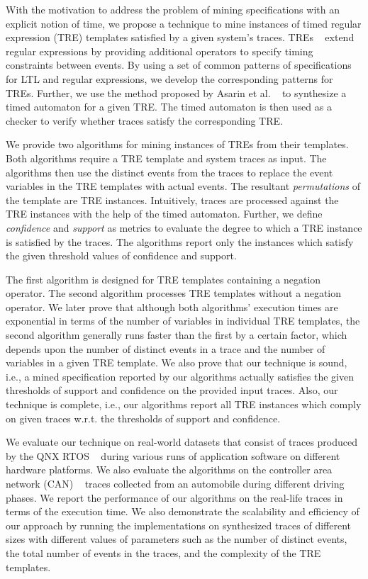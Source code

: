 \documentclass[]{sigplanconf}
\begin{document}
With the motivation to address the problem of mining specifications with an explicit notion of time, we propose a technique to mine instances of timed regular expression (TRE) templates satisfied by a given system's traces. TREs ~\cite{timedregex} extend regular expressions by providing additional operators to specify timing constraints between events. By using a set of common patterns of specifications for LTL and regular expressions, we develop the corresponding patterns for TREs. Further, we use the method proposed by Asarin et al. ~\cite{timedregex} to synthesize a timed automaton for a given TRE. The timed automaton is then used as a checker to verify whether traces satisfy the corresponding TRE.

We provide two algorithms for mining instances of TREs from their templates. Both algorithms require a TRE template and system traces as input. The algorithms then use the distinct events from the traces to replace the event variables in the TRE templates with actual events. The resultant \emph{permutations} of the template are TRE instances.
Intuitively, traces are processed against the TRE instances with the help of the timed automaton. Further, we define  \emph{confidence} and \emph{support} as metrics to evaluate the degree to which a TRE instance is satisfied by the traces. The algorithms report only the instances which satisfy the given threshold values of confidence and support.

The first algorithm is designed for TRE templates containing a negation operator. The second algorithm processes TRE templates without a negation operator.
We later prove that although both algorithms' execution times are exponential in terms of the number of variables in individual TRE templates, the second algorithm generally runs faster than the first by a certain factor, which depends upon the number of distinct events in a trace and the number of variables in a given TRE template. We also prove that our technique is sound, i.e., a mined specification reported by our algorithms actually satisfies the given thresholds of support and confidence on the provided input traces. Also, our technique is complete, i.e., our algorithms report all TRE instances which comply on given traces w.r.t. the thresholds of support and confidence.

We evaluate our technique on real-world datasets that consist of traces produced by the QNX RTOS ~\cite{QNX_RTOS} during various runs of application software on different hardware platforms. We also evaluate the algorithms on the controller area network (CAN) ~\cite{CAN} traces collected from an automobile during different driving phases. We report the performance of our algorithms on the real-life traces in terms of the execution time. We also demonstrate the scalability and efficiency of our approach by running the implementations on synthesized traces of different sizes with different values of parameters such as the number of distinct events, the total number of events in the traces, and the complexity of the TRE templates.
\end{document}
